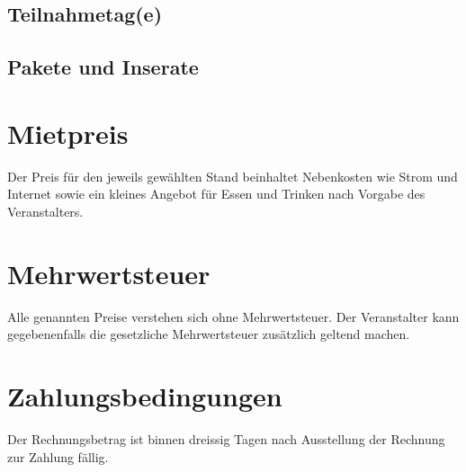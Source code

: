 \companyboothchoice\hfill\companyboothprice
\companyboothinfo

\subsection{Teilnahmetag(e)}

\companydatechoice

\subsection{Pakete und Inserate}

\companyextrachoice

\section{Mietpreis}

Der Preis für den jeweils gewählten Stand beinhaltet Nebenkosten wie Strom und Internet sowie ein kleines Angebot für Essen und Trinken nach Vorgabe des Veranstalters.

\section{Mehrwertsteuer}

Alle genannten Preise verstehen sich ohne Mehrwertsteuer. Der Veranstalter kann gegebenenfalls die gesetzliche Mehrwertsteuer zusätzlich geltend machen.

\section{Zahlungsbedingungen}

Der Rechnungsbetrag ist binnen dreissig Tagen nach Ausstellung der Rechnung zur Zahlung fällig.

